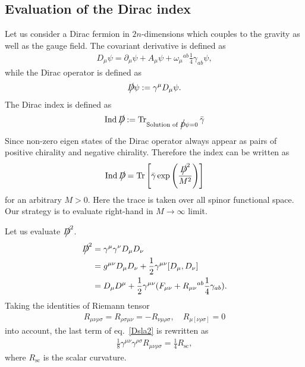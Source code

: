\documentclass[12pt,a4paper]{article}
\DeclareMathOperator*{\Ind}{\mathrm{Ind}}
\newcommand{\del}{\partial}
\newcommand{\gammab}{\bar{\gamma}}
\newcommand{\Dsla}{D\hspace{-0.65em}\big/}
\newcommand{\Rsc}{R_{\mathrm{sc}}}
\begin{document}
\subsection{Evaluation of the Dirac index}
Let us consider a Dirac fermion in $2n$-dimensions which couples to the gravity as well as the gauge field.  The covariant derivative is defined as
\begin{align*}
  D_{\mu}\psi=\del_{\mu}\psi+A_{\mu}\psi+\omega_{\mu}{}^{ab}\frac14 \gamma_{ab}\psi,
\end{align*}
while the Dirac operator is defined as
\begin{align*}
  \Dsla\psi:=\gamma^{\mu}D_{\mu}\psi.
\end{align*}
The Dirac index is defined as
\begin{align*}
  \Ind{\Dsla}:=\Tr_{\text{Solution of } \Dsla \psi=0} \gammab
\end{align*}
Since non-zero eigen states of the Dirac operator always appear as pairs of positive chirality and negative chirality.  Therefore the index can be written as
\begin{align*}
  \Ind{\Dsla}=\Tr \left[\gammab\exp\left(\frac{\Dsla^2}{M^2}\right)\right]\label{ind1}
\end{align*}
for an arbitrary $M>0$.  Here the trace is taken over all spinor functional space. Our strategy is to evaluate right-hand in $M\to \infty$ limit.

Let us evaluate $\Dsla^2$.
\begin{align}
  \Dsla^2
   & =\gamma^{\mu}\gamma^{\nu}D_{\mu}D_{\nu}                                                  \\
   & =g^{\mu\nu}D_{\mu}D_{\nu}+\frac12 \gamma^{\mu\nu}[D_{\mu},D_{\nu}]                       \\
   & =D_{\mu}D^{\mu}+\frac12 \gamma^{\mu\nu}(F_{\mu\nu}+R_{\mu\nu}{}^{ab}\frac14\gamma_{ab}).
  \label{Dsla2}
\end{align}
Taking the identities of Riemann tensor
\begin{align*}
  R_{\mu\nu\rho\sigma}=R_{\rho\sigma\mu\nu}=-R_{\nu\mu\rho\sigma}, \quad R_{\mu[\nu\rho\sigma]}=0
\end{align*}
into account, the last term of eq.~\eqref{Dsla2} is rewritten as
\begin{align*}
  \frac18\gamma^{\mu\nu}\gamma^{\rho\sigma}R_{\mu\nu\rho\sigma}
  =\frac14 \Rsc,
\end{align*}
where $\Rsc$ is the scalar curvature.
\end{document}
